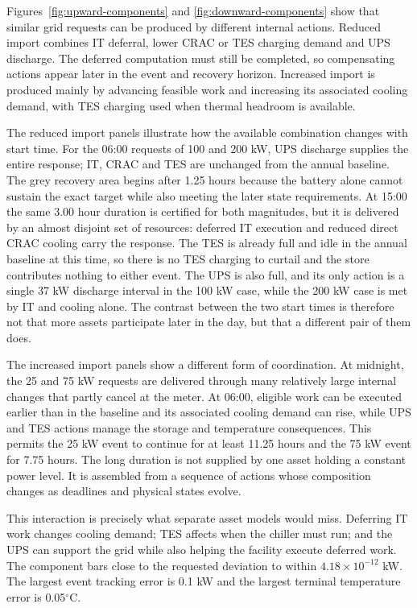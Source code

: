 Figures~\ref{fig:upward-components} and \ref{fig:downward-components} show that
similar grid requests can be produced by different internal actions. Reduced
import combines IT deferral, lower CRAC or TES charging demand and UPS discharge.
The deferred computation must still be completed, so compensating actions appear
later in the event and recovery horizon. Increased import is produced mainly by
advancing feasible work and increasing its associated cooling demand, with TES
charging used when thermal headroom is available.

The reduced import panels illustrate how the available combination changes with
start time. For the 06:00 requests of 100 and 200 kW, UPS discharge supplies the
entire response; IT, CRAC and TES are unchanged from the annual baseline. The
grey recovery area begins after 1.25 hours because the battery alone cannot
sustain the exact target while also meeting the later state requirements. At
15:00 the same 3.00 hour duration is certified for both magnitudes, but it is
delivered by an almost disjoint set of resources: deferred IT execution and
reduced direct CRAC cooling carry the response. The TES is already full and idle
in the annual baseline at this time, so there is no TES charging to curtail and
the store contributes nothing to either event. The UPS is also full, and its only
action is a single 37 kW discharge interval in the 100 kW case, while the 200 kW
case is met by IT and cooling alone. The contrast between the two start times is
therefore not that more assets participate later in the day, but that a different
pair of them does.

The increased import panels show a different form of coordination. At midnight,
the 25 and 75 kW requests are delivered through many relatively large internal
changes that partly cancel at the meter. At 06:00, eligible work can be executed
earlier than in the baseline and its associated cooling demand can rise, while
UPS and TES actions manage the storage and temperature consequences. This permits
the 25 kW event to continue for at least 11.25 hours and the 75 kW event for
7.75 hours.
The long duration is not supplied by one asset holding a constant power
level. It is assembled from a sequence of actions whose composition changes as
deadlines and physical states evolve.

This interaction is precisely what separate asset models would miss. Deferring
IT work changes cooling demand; TES affects when the chiller must run; and the
UPS can support the grid while also helping the facility execute deferred work.
The component bars close to the requested deviation to within
$4.18\times10^{-12}$ kW. The largest event tracking error is 0.1 kW and the
largest terminal temperature error is 0.05$^{\circ}$C.


